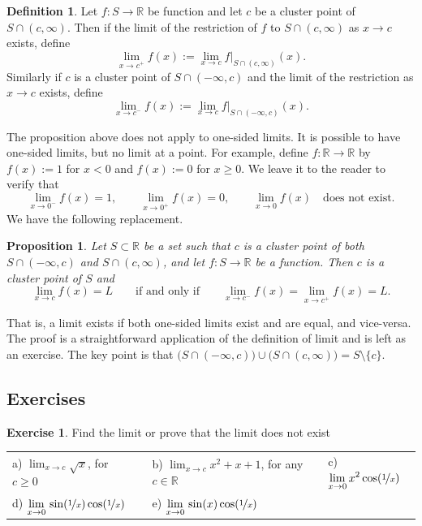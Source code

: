 \documentclass[12pt]{book}
\newcommand{\R}{{\mathbb{R}}}
\theoremstyle{plain}
\newtheorem{prop}[thm]{Proposition}
\theoremstyle{remark}
\theoremstyle{definition}
\newtheorem{defn}[thm]{Definition}
\theoremstyle{exercise}
\newtheorem{exercise}{Exercise}[section]
\theoremstyle{example}
\begin{document}
\begin{defn} \label{defn:onesidedlimits}
Let $f \colon S \to \R$ be function and let $c$ be a cluster point of
$S \cap (c,\infty)$.  Then if the limit
of the restriction of $f$ to $S \cap (c,\infty)$ 
 as $x \to c$ exists, define
\begin{equation*}
\lim_{x \to c^+} f(x) := \lim_{x\to c} f|_{S \cap (c,\infty)}(x) .
\end{equation*}
Similarly if $c$ is a cluster point of 
$S \cap (-\infty,c)$ and the limit of the restriction as $x \to c$
exists, define
\begin{equation*}
\lim_{x \to c^-} f(x) := \lim_{x\to c} f|_{S \cap (-\infty,c)}(x) .
\end{equation*}
\end{defn}

The proposition above does not apply to one-sided limits.
It is possible to have one-sided limits, but no limit at a point.  For
example, define $f \colon \R \to \R$ by $f(x) := 1$ for $x < 0$ and
$f(x) :=
0$ for $x \geq 0$.  We leave it to the reader to verify that
\begin{equation*}
\lim_{x \to 0^-} f(x) = 1, \qquad
\lim_{x \to 0^+} f(x) = 0, \qquad
\lim_{x \to 0} f(x) \quad \text{does not exist.}
\end{equation*}
We have the following replacement.


\begin{prop} \label{prop:onesidedlimits}
Let $S \subset \R$ be a set such that $c$ is a cluster point
of both $S \cap (-\infty,c)$ and $S \cap (c,\infty)$, and let
$f \colon S \to \R$ be a function.  Then $c$ is a cluster point of $S$ and
\begin{equation*}
\lim_{x \to c} f(x) = L
\qquad \text{if and only if} \qquad
\lim_{x \to c^-} f(x) =
\lim_{x \to c^+} f(x) =
L .
\end{equation*}
\end{prop}

That is, a limit exists if both one-sided limits exist and are equal, and
vice-versa.  The
proof is a straightforward application of the definition of limit
and is left as an exercise.  The key point is that
$\bigl( S \cap (-\infty,c) \bigr) \cup \bigl( S \cap (c,\infty) \bigr)
= S \setminus \{ c \}$.

\subsection{Exercises}

\begin{exercise}
Find the limit or prove that the limit does not exist

\medskip

\noindent
\begin{tabular}{lllll}
a)
$\displaystyle
\lim_{x\to c} \sqrt{x}
$, for $c \geq 0$
& &
b)
$\displaystyle
\lim_{x\to c} x^2+x+1
$, for any $c \in \R$
& &
c)
$\displaystyle
\lim_{x\to 0} x^2 \cos (\nicefrac{1}{x})
$
\\
d)
$\displaystyle
\lim_{x\to 0}\, \sin(\nicefrac{1}{x}) \cos (\nicefrac{1}{x})
$
& &
e)
$\displaystyle
\lim_{x\to 0}\, \sin(x) \cos (\nicefrac{1}{x})
$ & 
\end{tabular}
\end{exercise}
\end{document}
